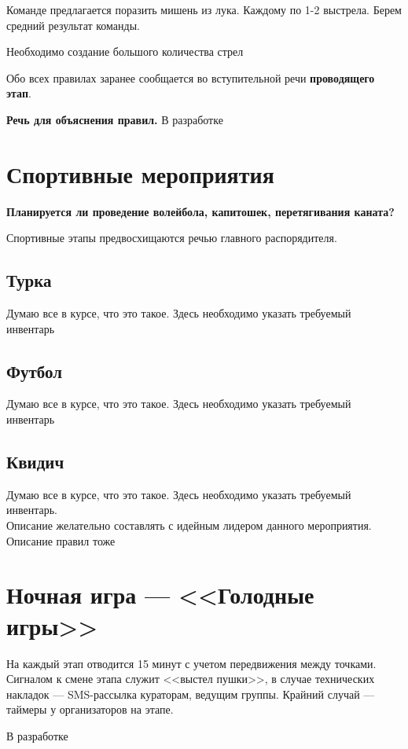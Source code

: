 \documentclass[a4paper, 14pt]{extarticle}
\theoremstyle{definition}
\begin{document}
\par Команде предлагается поразить мишень из лука. Каждому по 1-2 выстрела. Берем средний результат команды.

\par Необходимо создание большого количества стрел

\par Обо всех правилах заранее сообщается во вступительной речи \textbf{проводящего этап}.

\par \textbf{Речь для объяснения правил.} В разработке



\section{Спортивные мероприятия}
\par \textbf{Планируется ли проведение волейбола, капитошек, перетягивания каната?}
\par Спортивные этапы предвосхищаются речью главного распорядителя.

\subsection{Турка}
Думаю все в курсе, что это такое. Здесь необходимо указать требуемый инвентарь

\subsection{Футбол}
Думаю все в курсе, что это такое. Здесь необходимо указать требуемый инвентарь

\subsection{Квидич}
Думаю все в курсе, что это такое. Здесь необходимо указать требуемый инвентарь.\\
Описание желательно составлять с идейным лидером данного мероприятия.\\
Описание правил тоже



\section{Ночная игра --- <<Голодные игры>>}
\par На каждый этап отводится 15 минут с учетом передвижения между точками. Сигналом к смене этапа служит <<выстел пушки>>, в случае технических накладок --- SMS-рассылка кураторам, ведущим группы. Крайний случай --- таймеры у организаторов на этапе.
\par В разработке
\end{document}
